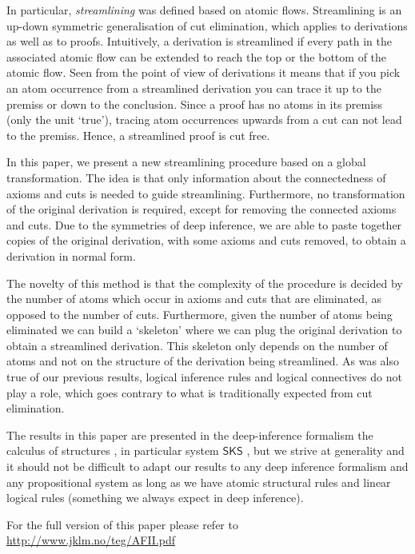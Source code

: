 \documentclass[a4paper]{llncs}
\begin{document}
In particular, \emph{streamlining} was defined based on atomic flows. Streamlining is an up-down symmetric generalisation of cut elimination, which applies to derivations as well as to proofs. Intuitively, a derivation is streamlined if every path in the associated atomic flow can be extended to reach the top or the bottom of the atomic flow. Seen from the point of view of derivations it means that if you pick an atom occurrence from a streamlined derivation you can trace it up to the premiss or down to the conclusion. Since a proof has no atoms in its premiss (only the unit `true'), tracing atom occurrences upwards from a cut can not lead to the premiss. Hence,  a streamlined proof is cut free.

In this paper, we present a new streamlining procedure based on a global transformation. The idea is that only information about the connectedness of axioms and cuts is needed to guide streamlining. Furthermore, no transformation of the original derivation is required, except for removing the connected axioms and cuts. Due to the symmetries of deep inference, we are able to paste together copies of the original derivation, with some axioms and cuts removed, to obtain a derivation in normal form.

The novelty of this method is that the complexity of the procedure is decided by the number of atoms which occur in axioms and cuts that are eliminated, as opposed to the number of cuts. Furthermore, given the number of atoms being eliminated we can build a `skeleton' where we can plug the original derivation to obtain a streamlined derivation. This skeleton only depends on the number of atoms and not on the structure of the derivation being streamlined. As was also true of our previous results, logical inference rules and logical connectives do not play a role, which goes contrary to what is traditionally expected from cut elimination.

\newcommand{\SKS}{\mathsf{SKS}}
The results in this paper are presented in the deep-inference formalism the calculus of structures \cite{Gugl:06:A-System:kl}, in particular system $\SKS$ \cite{BrunTiu:01:A-Local-:mz}, but we strive at generality and it should not be difficult to adapt our results to any deep inference formalism and any propositional system as long as we have atomic structural rules and linear logical rules (something we always expect in deep inference).

For the full version of this paper please refer to \url{http://www.jklm.no/teg/AFII.pdf}




\end{document}
